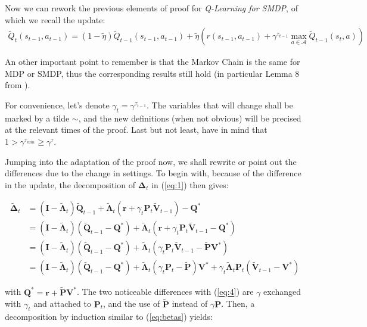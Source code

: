 Now we can rework the previous elements of proof for \emph{Q-Learning for SMDP}, of which we recall the update:
\begin{align}
  \tilde Q_t(s_{t-1}, a_{t-1}) = (1 - \tilde\eta)\tilde Q_{t-1}(s_{t-1}, a_{t-1}) + \tilde\eta \left(r(s_{t-1}, a_{t-1}) + \gamma^{\tau_{t-1}} \max_{a\in \mathcal{A}} \tilde Q_{t-1} (s_t, a)\right) \label{eq:SQL}
\end{align}

An other important point to remember is that the Markov Chain is the same for MDP or SMDP, thus the corresponding results still hold (in particular Lemma 8 from \cite{li_sample_2021}).

For convenience, let's denote $\gamma_t = \gamma^{\tau_{t-1}}$. The variables that will change shall be marked by a tilde $\sim$, and the new definitions (when not obvious) will be precised at the relevant times of the proof. Last but not least, have in mind that $1 > \gamma^{\tau_{min}} \geq \gamma^\tau$.

\smallskip

Jumping into the adaptation of the proof now, we shall rewrite or point out the differences due to the change in settings. To begin with, because of the difference in the update, the decomposition of $\mathbf{\Delta}_t$ in (\ref{eq:1}) then gives:

\begin{align}
  \tilde{\mathbf{\Delta}}_t &= (\mathbf{I} - \tilde{\mathbf{\Lambda}}_t)\tilde{\mathbf{Q}}_{t-1} + \tilde{\mathbf{\Lambda}}_t(\mathbf{r} + \gamma_t \mathbf{P}_t\tilde{\mathbf{V}}_{t-1}) - \mathbf{Q}^* \label{eq:1b}\\
  &= (\mathbf{I}-\tilde{\mathbf{\Lambda}}_t)(\tilde{\mathbf{Q}}_{t-1} - \mathbf{Q}^*) + \tilde{\mathbf{\Lambda}}_t(\mathbf{r} + \gamma_t\mathbf{P}_t\tilde{\mathbf{V}}_{t-1} - \mathbf{Q}^*)\label{eq:2b}\\
  &= (\mathbf{I}-\tilde{\mathbf{\Lambda}}_t)(\tilde{\mathbf{Q}}_{t-1} - \mathbf{Q}^*) + \tilde{\mathbf{\Lambda}}_t(\gamma_t\mathbf{P}_t\tilde{\mathbf{V}}_{t-1} - \tilde{\mathbf{P}}\mathbf{V}^*) \label{eq:3b}\\
  &= (\mathbf{I}-\tilde{\mathbf{\Lambda}}_t)(\tilde{\mathbf{Q}}_{t-1} - \mathbf{Q}^*) + \tilde{\mathbf{\Lambda}}_t(\gamma_t\mathbf{P}_t - \tilde{\mathbf{P}})\mathbf{V}^* + \gamma_t\tilde{\mathbf{\Lambda}}_t \mathbf{P}_t(\tilde{\mathbf{V}}_{t-1} - \mathbf{V}^*) \label{eq:4b}
\end{align}

with $\mathbf{Q}^* = \mathbf{r} + \tilde{\mathbf{P}}\mathbf{V}^*$. The two noticeable differences with (\ref{eq:4}) are $\gamma$ exchanged with $\gamma_t$ and attached to $\mathbf{P}_t$, and the use of $\tilde{\mathbf{P}}$ instead of $\gamma \mathbf{P}$. Then, a decomposition by induction similar to (\ref{eq:betas}) yields:

